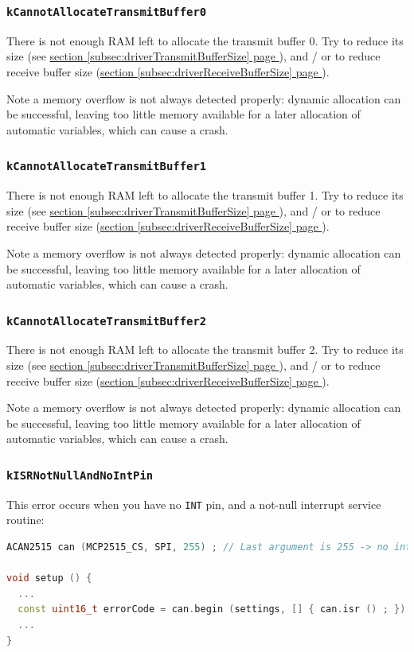 \documentclass[10pt, a4paper, obeyspaces]{extarticle}
\newcommand\refSubsectionPage[1]{\hyperref[subsec:#1]{section \ref*{subsec:#1} page \pageref{subsec:#1}}}
\newcommand \subsubsectionLabel[2]{\subsubsection{#1}\label{subsubsec:#2}}
\begin{document}
\subsubsectionLabel{\texttt{kCannotAllocateTransmitBuffer0}}{kCannotAllocateTransmitBuffer0}

There is not enough RAM left to allocate the transmit buffer 0. Try to reduce its size (see \refSubsectionPage{driverTransmitBufferSize}), and / or to reduce receive buffer size (\refSubsectionPage{driverReceiveBufferSize}).

Note a memory overflow is not always detected properly: dynamic allocation can be successful, leaving too little memory available for a later allocation of automatic variables, which can cause a crash.



\subsubsectionLabel{\texttt{kCannotAllocateTransmitBuffer1}}{kCannotAllocateTransmitBuffer1}

There is not enough RAM left to allocate the transmit buffer 1. Try to reduce its size (see \refSubsectionPage{driverTransmitBufferSize}), and / or to reduce receive buffer size (\refSubsectionPage{driverReceiveBufferSize}).

Note a memory overflow is not always detected properly: dynamic allocation can be successful, leaving too little memory available for a later allocation of automatic variables, which can cause a crash.




\subsubsectionLabel{\texttt{kCannotAllocateTransmitBuffer2}}{kCannotAllocateTransmitBuffer2}

There is not enough RAM left to allocate the transmit buffer 2. Try to reduce its size (see \refSubsectionPage{driverTransmitBufferSize}), and / or to reduce receive buffer size (\refSubsectionPage{driverReceiveBufferSize}).

Note a memory overflow is not always detected properly: dynamic allocation can be successful, leaving too little memory available for a later allocation of automatic variables, which can cause a crash.





\subsubsectionLabel{\texttt{kISRNotNullAndNoIntPin}}{kISRNotNullAndNoIntPin}

This error occurs when you have no \texttt{INT} pin, and a not-null interrupt service routine: 
{ \small\begin{lstlisting}[language=c++]
ACAN2515 can (MCP2515_CS, SPI, 255) ; // Last argument is 255 -> no interrupt pin

void setup () {
  ...
  const uint16_t errorCode = can.begin (settings, [] { can.isr () ; }) ; // ISR is not null
  ...
}
\end{lstlisting}}
\end{document}
